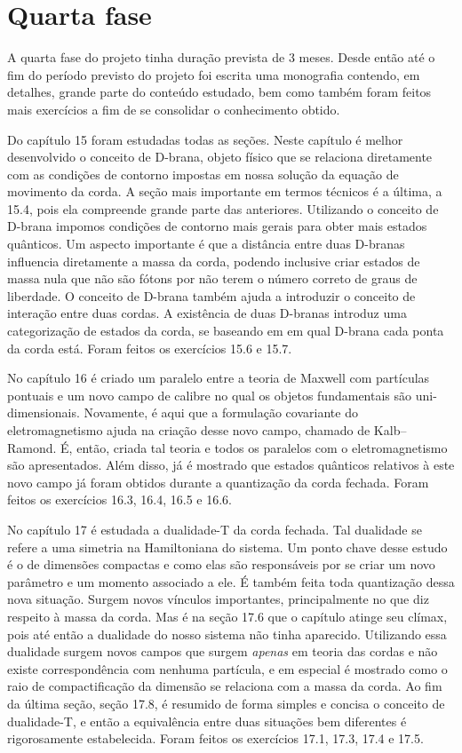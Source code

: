 \documentclass[oneside, 12pt]{article}
\begin{document}
\section{Quarta fase}

A quarta fase do projeto tinha duração prevista de 3 meses. Desde então até o fim do período previsto do projeto foi escrita uma monografia contendo, em detalhes, grande parte do conteúdo estudado, bem como também foram feitos mais exercícios a fim de se consolidar o conhecimento obtido.\par 

Do capítulo 15 foram estudadas todas as seções. Neste capítulo é melhor desenvolvido o conceito de D-brana, objeto físico que se relaciona diretamente com as condições de contorno impostas em nossa solução da equação de movimento da corda. A seção mais importante em termos técnicos é a última, a 15.4, pois ela compreende grande parte das anteriores. Utilizando o conceito de D-brana impomos condições de contorno mais gerais para obter mais estados quânticos. Um aspecto importante é que a distância entre duas D-branas influencia diretamente a massa da corda, podendo inclusive criar estados de massa nula que não são fótons por não terem o número correto de graus de liberdade. O conceito de D-brana também ajuda a introduzir o conceito de interação entre duas cordas. A existência de duas D-branas introduz uma categorização de estados da corda, se baseando em em qual D-brana cada ponta da corda está. Foram feitos os exercícios 15.6 e 15.7.\par 

No capítulo 16 é criado um paralelo entre a teoria de Maxwell com partículas pontuais e um novo campo de calibre no qual os objetos fundamentais são uni-dimensionais. Novamente, é aqui que a formulação covariante do eletromagnetismo ajuda na criação desse novo campo, chamado de Kalb–Ramond. É, então, criada tal teoria e todos os paralelos com o eletromagnetismo são apresentados. Além disso, já é mostrado que estados quânticos relativos à este novo campo já foram obtidos durante a quantização da corda fechada. Foram feitos os exercícios 16.3, 16.4, 16.5 e 16.6.\par

No capítulo 17 é estudada a dualidade-T da corda fechada. Tal dualidade se refere a uma simetria na Hamiltoniana do sistema. Um ponto chave desse estudo é o de dimensões compactas e como elas são responsáveis por se criar um novo parâmetro e um momento associado a ele. É também feita toda quantização dessa nova situação. Surgem novos vínculos importantes, principalmente no que diz respeito à massa da corda. Mas é na seção 17.6 que o capítulo atinge seu clímax, pois até então a dualidade do nosso sistema não tinha aparecido. Utilizando essa dualidade surgem novos campos que surgem \textit{apenas} em teoria das cordas e não existe correspondência com nenhuma partícula, e em especial é mostrado como o raio de compactificação da dimensão se relaciona com a massa da corda. Ao fim da última seção, seção 17.8, é resumido de forma simples e concisa o conceito de dualidade-T, e então a equivalência entre duas situações bem diferentes é rigorosamente estabelecida. Foram feitos os exercícios 17.1, 17.3, 17.4 e 17.5.\par 
\end{document}
